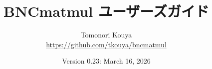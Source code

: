 \documentclass[a4j,report]{jsbook}
\newif\ifJP \JPtrue    %
\newcommand{\bi}[2]{\ifJP #2\else #1\fi}
\begin{document}
\title{\bi{BNCmatmul User's Guide}{BNCmatmul ユーザーズガイド}}
\author{Tomonori Kouya\\\url{https://github.com/tkouya/bncmatmul}}
\date{Version 0.23: March 16, 2026}

\maketitle

\frontmatter

\tableofcontents

\mainmatter

















\end{document}
